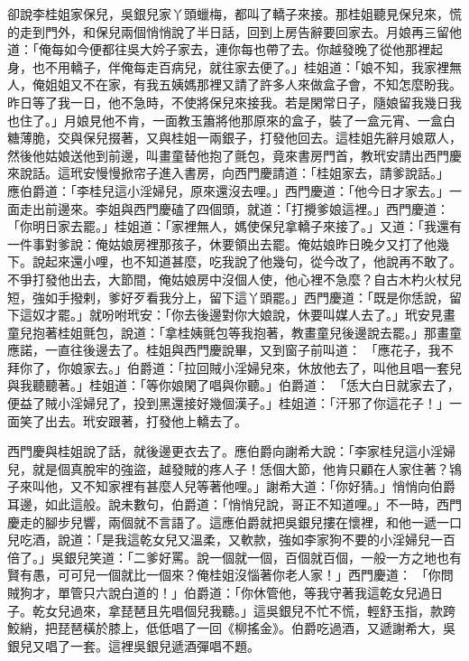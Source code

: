 卻說李桂姐家保兒，吳銀兒家丫頭蠟梅，都叫了轎子來接。那桂姐聽見保兒來，慌的走到門外，和保兒兩個悄悄說了半日話，回到上房告辭要回家去。月娘再三留他道：「俺每如今便都往吳大妗子家去，連你每也帶了去。你越發晚了從他那裡起身，也不用轎子，伴俺每走百病兒，就往家去便了。」桂姐道：「娘不知，我家裡無人，俺姐姐又不在家，有我五姨媽那裡又請了許多人來做盒子會，不知怎麼盼我。昨日等了我一日，他不急時，不使將保兒來接我。若是閑常日子，隨娘留我幾日我也住了。」月娘見他不肯，一面教玉簫將他那原來的盒子，裝了一盒元宵、一盒白糖薄脆，交與保兒掇著，又與桂姐一兩銀子，打發他回去。這桂姐先辭月娘眾人，然後他姑娘送他到前邊，叫畫童替他抱了氈包，竟來書房門首，教玳安請出西門慶來說話。這玳安慢慢掀帘子進入書房，向西門慶請道：「桂姐家去，請爹說話。」 應伯爵道：「李桂兒這小淫婦兒，原來還沒去哩。」西門慶道：「他今日才家去。」一面走出前邊來。李姐與西門慶磕了四個頭，就道：「打攪爹娘這裡。」西門慶道：「你明日家去罷。」桂姐道：「家裡無人，媽使保兒拿轎子來接了。」又道：「我還有一件事對爹說：俺姑娘房裡那孩子，休要領出去罷。俺姑娘昨日晚夕又打了他幾下。說起來還小哩，也不知道甚麼，吃我說了他幾句，從今改了，他說再不敢了。不爭打發他出去，大節間，俺姑娘房中沒個人使，他心裡不急麼？自古木杓火杖兒短，強如手撥剌，爹好歹看我分上，留下這丫頭罷。」西門慶道：「既是你恁說，留下這奴才罷。」就吩咐玳安：「你去後邊對你大娘說，休要叫媒人去了。」玳安見畫童兒抱著桂姐氈包，說道：「拿桂姨氈包等我抱著，教畫童兒後邊說去罷。」那畫童應諾，一直往後邊去了。桂姐與西門慶說畢，又到窗子前叫道： 「應花子，我不拜你了，你娘家去。」伯爵道：「拉回賊小淫婦兒來，休放他去了，叫他且唱一套兒與我聽聽著。」桂姐道：「等你娘閑了唱與你聽。」伯爵道： 「恁大白日就家去了，便益了賊小淫婦兒了，投到黑還接好幾個漢子。」桂姐道：「汗邪了你這花子！」一面笑了出去。玳安跟著，打發他上轎去了。

西門慶與桂姐說了話，就後邊更衣去了。應伯爵向謝希大說：「李家桂兒這小淫婦兒，就是個真脫牢的強盜，越發賊的疼人子！恁個大節，他肯只顧在人家住著？鴇子來叫他，又不知家裡有甚麼人兒等著他哩。」謝希大道：「你好猜。」悄悄向伯爵耳邊，如此這般。說未數句，伯爵道：「悄悄兒說，哥正不知道哩。」不一時，西門慶走的腳步兒響，兩個就不言語了。這應伯爵就把吳銀兒摟在懷裡，和他一遞一口兒吃酒，說道：「是我這乾女兒又溫柔，又軟款，強如李家狗不要的小淫婦兒一百倍了。」吳銀兒笑道：「二爹好罵。說一個就一個，百個就百個，一般一方之地也有賢有愚，可可兒一個就比一個來？俺桂姐沒惱著你老人家！」西門慶道： 「你問賊狗才，單管只六說白道的！」伯爵道：「你休管他，等我守著我這乾女兒過日子。乾女兒過來，拿琵琶且先唱個兒我聽。」這吳銀兒不忙不慌，輕舒玉指，款跨鮫綃，把琵琶橫於膝上，低低唱了一回《柳搖金》。伯爵吃過酒，又遞謝希大，吳銀兒又唱了一套。這裡吳銀兒遞酒彈唱不題。

